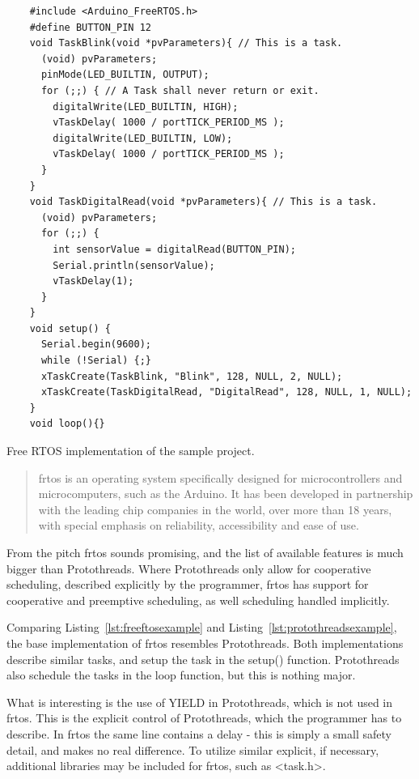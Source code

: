 \begin{listing}[htb!]
  \centering
  \begin{verbatim}
    #include <Arduino_FreeRTOS.h>
    #define BUTTON_PIN 12
    void TaskBlink(void *pvParameters){ // This is a task.
      (void) pvParameters;
      pinMode(LED_BUILTIN, OUTPUT);
      for (;;) { // A Task shall never return or exit.
        digitalWrite(LED_BUILTIN, HIGH);
        vTaskDelay( 1000 / portTICK_PERIOD_MS );
        digitalWrite(LED_BUILTIN, LOW);
        vTaskDelay( 1000 / portTICK_PERIOD_MS );
      }
    }
    void TaskDigitalRead(void *pvParameters){ // This is a task.
      (void) pvParameters;
      for (;;) {
        int sensorValue = digitalRead(BUTTON_PIN);
        Serial.println(sensorValue);
        vTaskDelay(1);
      }
    }
    void setup() {
      Serial.begin(9600);
      while (!Serial) {;}
      xTaskCreate(TaskBlink, "Blink", 128, NULL, 2, NULL);
      xTaskCreate(TaskDigitalRead, "DigitalRead", 128, NULL, 1, NULL);
    }
    void loop(){}
\end{verbatim}
  \caption{Free RTOS implementation of the sample project.}
  \label{lst:freeftosexample}
\end{listing}


\blockcquote{AboutRTOS}{\gls{frtos} is an operating system specifically designed for microcontrollers and microcomputers, such as the Arduino. It has been developed in partnership with the leading chip companies in the world, over more than 18 years, with special emphasis on reliability, accessibility and ease of use.}

From the pitch \gls{frtos} sounds promising, and the list of available features is much bigger than Protothreads. Where Protothreads only allow for cooperative scheduling, described explicitly by the programmer, \gls{frtos} has support for cooperative and preemptive scheduling, as well scheduling handled implicitly.

Comparing Listing~\ref{lst:freeftosexample} and Listing~\ref{lst:protothreadsexample}, the base implementation of \gls{frtos} resembles Protothreads. Both implementations describe similar tasks, and setup the task in the setup() function. Protothreads also schedule the tasks in the loop function, but this is nothing major.

What is interesting is the use of YIELD in Protothreads, which is not used in \gls{frtos}. This is the explicit control of Protothreads, which the programmer has to describe. In \gls{frtos} the same line contains a delay - this is simply a small safety detail, and makes no real difference. To utilize similar explicit, if necessary, additional libraries may be included for \gls{frtos}, such as <task.h>.

